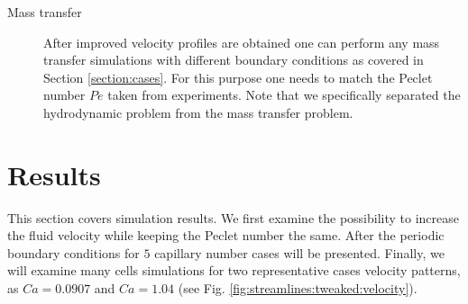 \documentclass{article}
\newcommand{\ububble}{U_{\mathrm{bubble}}}
\begin{document}
\begin{description}
\item[Mass transfer] After improved velocity profiles are obtained one can perform any mass
transfer simulations with different boundary conditions as covered in Section \ref{section:cases}.
For this purpose one needs to match the Peclet number $Pe$ taken from experiments. Note that we
specifically separated the hydrodynamic problem from the mass transfer problem. 
\end{description}

\section{Results}
This section covers simulation results. We first examine the possibility to increase the fluid
velocity while keeping the Peclet number the same. After the periodic boundary
conditions for $5$ capillary number cases will be presented. Finally, we will examine
many
cells simulations for two representative cases velocity patterns, as $Ca=0.0907$ and $Ca=1.04$
(see Fig. \ref{fig:streamlines:tweaked:velocity}). 
\end{document}
